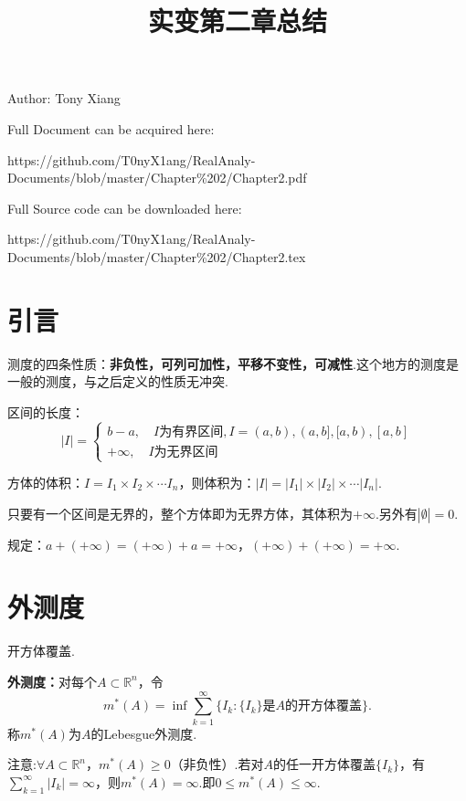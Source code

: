 \documentclass[bwprint, withoutpreface]{cumcmthesis}
\title{实变第二章总结}
\begin{document}
\maketitle
\noindent Author: Tony Xiang

\noindent Full Document can be acquired here: 

\noindent https://github.com/T0nyX1ang/RealAnaly-Documents/blob/master/Chapter\%202/Chapter2.pdf

\noindent Full Source code can be downloaded here:

\noindent https://github.com/T0nyX1ang/RealAnaly-Documents/blob/master/Chapter\%202/Chapter2.tex

\section{引言}
\indent 测度的四条性质：\textbf{非负性，可列可加性，平移不变性，可减性}.这个地方的测度是一般的测度，与之后定义的性质无冲突.

区间的长度：
\begin{equation*}
	|I| = 
	\begin{cases}
		b - a, \quad \mbox{$I$为有界区间}, I = (a, b), (a, b], [a, b), [a, b] \\
		+\infty, \quad \mbox{$I$为无界区间}
	\end{cases}	
\end{equation*}

方体的体积：$I = I_1 \times I_2 \times \cdots I_n$，则体积为：$|I| = |I_1| \times |I_2| \times \cdots |I_n|$.

只要有一个区间是无界的，整个方体即为无界方体，其体积为$+\infty$.另外有$|\emptyset| = 0$.

规定：$a + (+\infty) = (+\infty) + a = +\infty$，$(+\infty) + (+\infty) = +\infty$.

\section{外测度}
\indent 开方体覆盖.

\textbf{外测度：}对每个$A \subset \mathbb{R}^n$，令
\begin{equation*}
	m^*(A) = \inf{\sum_{k = 1}^{\infty}\{{I_k}: \{I_k\} \mbox{是$A$的开方体覆盖}\}}.
\end{equation*}
称$m^*(A)$为$A$的Lebesgue外测度.

注意:$\forall A \subset \mathbb{R}^n$，$m^*(A) \geqslant 0$（非负性）.若对$A$的任一开方体覆盖$\{I_k\}$，有$\sum_{k = 1}^{\infty}|I_k| = \infty$，则$m^*(A) = \infty$.即$0 \leqslant m^*(A) \leqslant \infty$.
\end{document}
